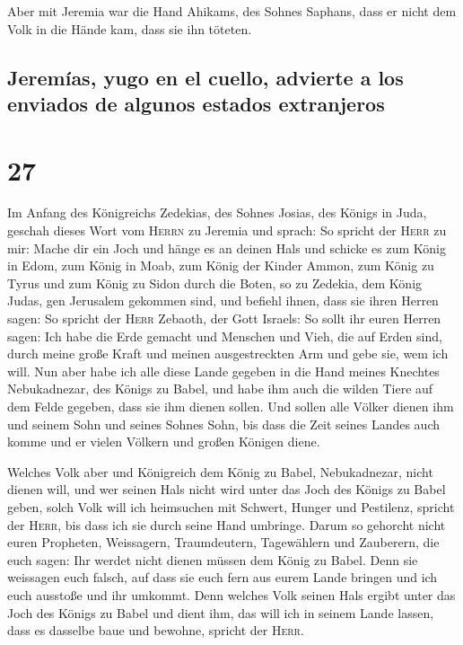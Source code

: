  Aber mit Jeremia war die Hand Ahikams, des Sohnes
Saphans, dass er nicht dem Volk in die Hände kam, dass sie ihn töteten.

\hypertarget{jeremuxedas-yugo-en-el-cuello-advierte-a-los-enviados-de-algunos-estados-extranjeros}{%
\subsection{Jeremías, yugo en el cuello, advierte a los enviados de
algunos estados
extranjeros}\label{jeremuxedas-yugo-en-el-cuello-advierte-a-los-enviados-de-algunos-estados-extranjeros}}

\hypertarget{section-26}{%
\section{27}\label{section-26}}

 Im Anfang des Königreichs Zedekias, des Sohnes Josias,
des Königs in Juda, geschah dieses Wort vom \textsc{Herrn} zu Jeremia
und sprach:  So spricht der \textsc{Herr} zu mir: Mache
dir ein Joch und hänge es an deinen Hals  und schicke es
zum König in Edom, zum König in Moab, zum König der Kinder Ammon, zum
König zu Tyrus und zum König zu Sidon durch die Boten, so zu Zedekia,
dem König Judas, gen Jerusalem gekommen sind,  und befiehl
ihnen, dass sie ihren Herren sagen: So spricht der \textsc{Herr}
Zebaoth, der Gott Israels: So sollt ihr euren Herren sagen:
 Ich habe die Erde gemacht und Menschen und Vieh, die auf
Erden sind, durch meine große Kraft und meinen ausgestreckten Arm und
gebe sie, wem ich will.  Nun aber habe ich alle diese
Lande gegeben in die Hand meines Knechtes Nebukadnezar, des Königs zu
Babel, und habe ihm auch die wilden Tiere auf dem Felde gegeben, dass
sie ihm dienen sollen.  Und sollen alle Völker dienen ihm
und seinem Sohn und seines Sohnes Sohn, bis dass die Zeit seines Landes
auch komme und er vielen Völkern und großen Königen diene.

 Welches Volk aber und Königreich dem König zu Babel,
Nebukadnezar, nicht dienen will, und wer seinen Hals nicht wird unter
das Joch des Königs zu Babel geben, solch Volk will ich heimsuchen mit
Schwert, Hunger und Pestilenz, spricht der \textsc{Herr}, bis dass ich
sie durch seine Hand umbringe.  Darum so gehorcht nicht
euren Propheten, Weissagern, Traumdeutern, Tagewählern und Zauberern,
die euch sagen: Ihr werdet nicht dienen müssen dem König zu Babel.
 Denn sie weissagen euch falsch, auf dass sie euch fern
aus eurem Lande bringen und ich euch ausstoße und ihr umkommt.
 Denn welches Volk seinen Hals ergibt unter das Joch des
Königs zu Babel und dient ihm, das will ich in seinem Lande lassen, dass
es dasselbe baue und bewohne, spricht der \textsc{Herr}.

